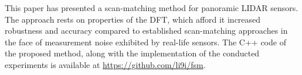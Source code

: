This paper has presented a scan-matching method for panoramic LIDAR sensors.
The approach rests on properties of the DFT, which afford it increased
robustness and accuracy compared to established scan-matching approaches in the
face of measurement noise exhibited by real-life sensors. The C++ code of the
proposed method, along with the implementation of the conducted experiments is
available at \url{https://github.com/li9i/fsm}.

